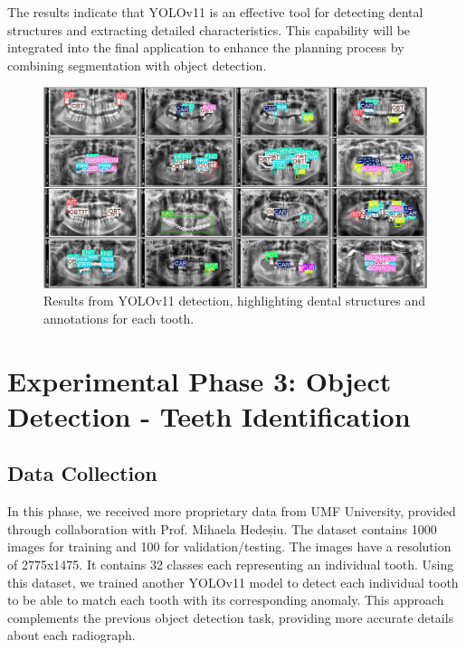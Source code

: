 \documentclass[12pt]{article}
\begin{document}
\newpage

The results indicate that YOLOv11 is an effective tool for detecting dental structures and extracting detailed characteristics. This capability will be integrated into the final application to enhance the planning process by combining segmentation with object detection.

\begin{figure}[H]
    \centering
    \includegraphics[width=0.6\linewidth]{val_batch1_labels.jpg}
    \caption{Results from YOLOv11 detection, highlighting dental structures and annotations for each tooth.}
    \label{fig:yolo-output}
\end{figure}

\newpage

\section{Experimental Phase 3: Object Detection - Teeth Identification}

\subsection{Data Collection}
In this phase, we received more proprietary data from UMF University, provided through collaboration with Prof. Mihaela Hedeșiu. The dataset contains 1000 images for training and 100 for validation/testing. The images have a resolution of 2775x1475. It contains 32 classes each representing an individual tooth. Using this dataset, we trained another YOLOv11 model to detect each individual tooth to be able to match each tooth with its corresponding anomaly. This approach complements the previous object detection task, providing more accurate details about each radiograph.
\end{document}
